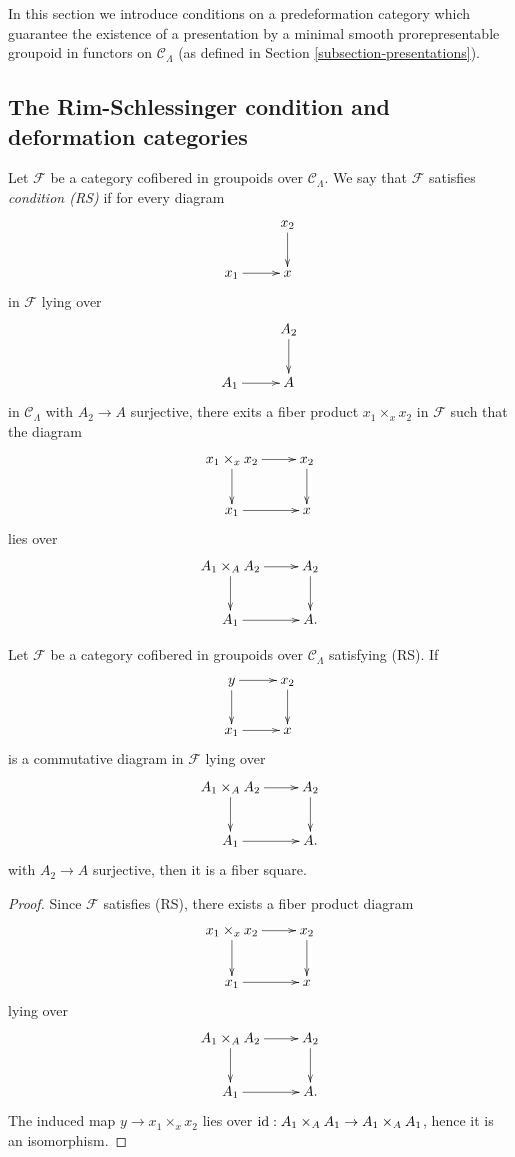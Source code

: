 \noindent
In this section we introduce conditions on a predeformation category which 
guarantee the existence of a presentation by a minimal smooth prorepresentable 
groupoid in functors on $\mathcal C_{\Lambda}$ (as defined in Section 
\ref{subsection-presentations}).

\subsection{The Rim-Schlessinger condition and deformation categories}
\label{subsection-RS-condition}

\begin{definition}
\label{definition-RS}
Let $\mathcal F$ be a category cofibered in groupoids over $\mathcal 
C_{\Lambda}$.  We say that $\mathcal F$ satisfies {\it condition (RS)}
if for every diagram
\[
\xymatrix{
           & x_2 \ar[d] \\
x_1 \ar[r] & x   
}
\]
in $\mathcal F$ lying over
\[
\xymatrix{
           & A_2 \ar[d] \\
A_1 \ar[r] & A   
}
\]  
in $\mathcal C_{\Lambda}$ with $A_2 \rightarrow A$ surjective, there exits a 
fiber product $x_1 \times_{x} x_2$ in $\mathcal F$ such that the diagram
\[
\xymatrix{
x_1 \times_{x} x_2 \ar[r] \ar[d] & x_2 \ar[d] \\
x_1 \ar[r]      & x   
}
\]
lies over
\[
\xymatrix{
A_1 \times_{A} A_2 \ar[r] \ar[d] & A_2 \ar[d] \\
A_1 \ar[r]      & A.   
}
\]
\end{definition}

\begin{lemma}
\label{lemma-RS-fiber-square}
Let $\mathcal F$ be a category cofibered in groupoids over $\mathcal 
C_{\Lambda}$ satisfying \textnormal{(RS)}.  If
\[
\xymatrix{
y \ar[r] \ar[d] & x_2 \ar[d]   \\
x_1 \ar[r]      & x  
}
\]
is a commutative diagram in $\mathcal F$ lying over
\[
\xymatrix{
A_1 \times_{A} A_2 \ar[r] \ar[d] & A_2 \ar[d] \\
A_1 \ar[r]      & A.   
}
\]
with $A_2 \rightarrow A$ surjective, then it is a fiber square.
\end{lemma}

\begin{proof}
Since $\mathcal F$ satisfies (RS), there exists a fiber product diagram
\[
\xymatrix{
x_1 \times_{x} x_2 \ar[r] \ar[d] & x_2 \ar[d] \\
x_1 \ar[r]      & x   
}
\]
lying over 
\[
\xymatrix{
A_1 \times_{A} A_2 \ar[r] \ar[d] & A_2 \ar[d] \\
A_1 \ar[r]      & A.   
}
\]
The induced map $y \rightarrow x_1 \times_{x} x_2$ lies over $\textnormal{id}: 
A_1 \times_{A} A_1 \rightarrow A_1 \times_{A} A_1$, hence it is an isomorphism.
\end{proof}

